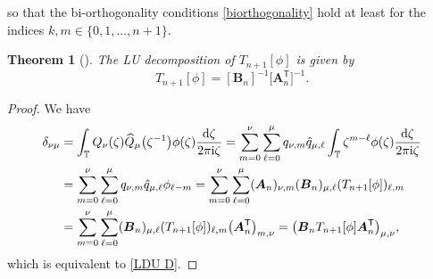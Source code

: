 \documentclass[10pt,a4paper]{amsart}
\numberwithin{equation}{section}
\newtheorem{Theorem}{Theorem}[section]
\newcommand{\T}{{\mathbb T}}
\newcommand{\ze}{\zeta}
\newcommand{\ii}{{\rm i}}
\newcommand{\dd}{{\rm d}}
\begin{document}
		so that the bi-orthogonality conditions \eqref{biorthogonality} hold at least for the indices $k,m \in \{0,1,\dots,n+1\}$.
		\begin{Theorem}[\cite{GW}]
			The LU decomposition of $T_{n+1}[\phi]$ is given by
			\begin{equation}\label{LDU D}
				T_{n+1}[\phi] = [\boldsymbol{B}_{n}]^{-1} 	 \big[\boldsymbol{A}_{n}^{\mathsf T}\big]^{-1}.
			\end{equation}
		\end{Theorem}
		\begin{proof}
			We have
			\begin{align*}
					\delta_{\nu \mu} & = \int_{\T} Q_{\nu}(\ze) \widehat{Q}_{\mu}\big(\ze^{-1}\big) \phi(\ze) \frac{\dd \ze}{2\pi \ii \ze} = \sum_{m=0}^{\nu} \sum_{\ell=0}^{\mu} q_{\nu,m}\hat{q}_{\mu,\ell} \int_{\T} \ze^{m-\ell} \phi(\ze) \frac{\dd \ze}{2\pi \ii \ze} \\
&
					= \sum_{m=0}^{\nu} \sum_{\ell=0}^{\mu} q_{\nu,m}\hat{q}_{\mu,\ell} \phi_{\ell-m} = \sum_{m=0}^{\nu} \sum_{\ell=0}^{\mu} ( \boldsymbol{A}_{n} )_{\nu,m} ( \boldsymbol{B}_{n} )_{\mu,\ell} ( T_{n+1}[\phi] )_{\ell,m} \\
& = \sum_{m=0}^{\nu} \sum_{\ell=0}^{\mu} ( \boldsymbol{B}_{n} )_{\mu,\ell} ( T_{n+1}[\phi] )_{\ell,m} \big( \boldsymbol{A}_{n}^{\mathsf T} \big)_{m,\nu} = \big( \boldsymbol{B}_{n} T_{n+1}[\phi] \boldsymbol{A}_{n}^{\mathsf T} \big)_{\mu,\nu},
			\end{align*}
			which is equivalent to \eqref{LDU D}.
		\end{proof}
\end{document}
